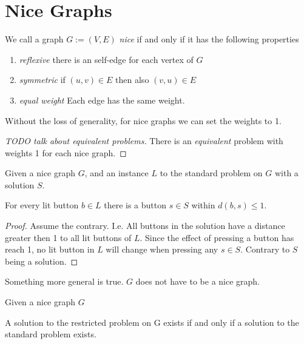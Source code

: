 \section{Nice Graphs}
We call a graph $G:=(V, E)$ \emph{nice} if and only if it has the following properties

\begin{enumerate}
    \item \emph{reflexive} there is an self-edge for each vertex of $G$
    \item \emph{symmetric} if $(u,v)\in E$ then also $(v,u)\in E$
    \item \emph{equal weight} Each edge has the same weight.
\end{enumerate}

Without the loss of generality, for nice graphs we can set the weights to 1.

\begin{proof}[TODO talk about equivalent problems]
    There is an \emph{equivalent} problem with weights 1 for each nice graph.
\end{proof}

\begin{lemma}\label{close-press-button}
    Given a nice graph $G$, and an instance $L$ to the standard problem on $G$ with a solution $S$.

    For every lit button $b\in L$ there is a button $s\in S$ within $d(b,s) \leq 1$. 
\end{lemma}

\begin{proof}
    Assume the contrary. I.e. All buttons in the solution have a distance greater then 1 to all lit buttons of $L$. Since the effect of pressing a button has reach 1, no lit button in $L$ will change when pressing any $s\in S$.
    Contrary to $S$ being a solution.
\end{proof}

\begin{remark}
    Something more general is true. $G$ does not have to be a nice graph.
\end{remark}

\begin{lemma}\label{restricted-solution}
    Given a nice graph $G$

    A solution to the restricted problem on G exists if and only if a solution to the standard problem exists.
\end{lemma}

